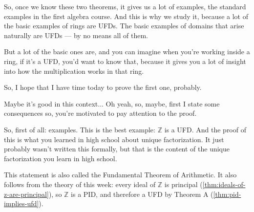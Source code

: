\begin{speech}[00:17:25 - 00:18:35]
So, once we know these two theorems,  it gives us a lot of examples, the standard examples in the first algebra course. And this is why we study it, because a lot of the basic examples of rings are UFDs. The basic examples of domains that arise naturally are UFDs --- by no means all of them.

But a lot of the basic ones are, and you can imagine when you're working inside a ring, if it's a UFD, you'd want to know that, because it gives you a lot of insight into how the multiplication works in that ring. 

So, I hope that I have time today to prove the first one, probably.

Maybe it's good in this context... Oh yeah, so, maybe, first I state some consequences so, you're motivated to pay attention to the proof.

So, first of all: examples.  This is the best example: $\mathbb{Z}$ is a UFD.  And the proof of this is what you learned in high school about unique factorization. It just probably wasn't written this formally, but that is the content of the unique factorization you learn in high school.
\end{speech}

\begin{hidden}
\end{hidden}

\begin{content}
\end{content}

\begin{aiNote}
This statement is also called the Fundamental Theorem of Arithmetic. It also follows from the theory of this week: every ideal of $\mathbb{Z}$ is principal (\cref{thm:ideals-of-z-are-principal}), so $\mathbb{Z}$ is a PID, and therefore a UFD by Theorem A (\cref{thm:pid-implies-ufd}).
\end{aiNote}

